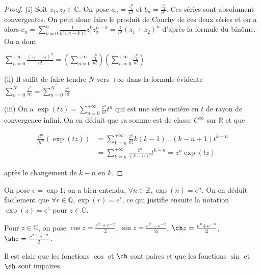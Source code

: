 \begin{proof}
(i) Soit $z_1, z_2 \in \mathbb{C}$. On pose $a_n = \frac{z_1^n}{n!}$ et $b_n = \frac{z_2^n}{n!}$. Ces séries sont absolument convergentes. On peut donc faire le produit de Cauchy de ces deux séries et on a alors $c_n = \sum_{k=0}^n \frac{1}{k!(n-k)!} z_1^k z_2^{n-k} = \frac{1}{n!}(z_1 + z_2)^n$ d'après la formule du binôme. On a donc

$\sum_{n=0}^{+\infty} \frac{(z_1 + z_2)^n}{n!} = \left(\sum_{n=0}^{+\infty} \frac{z_1^n}{n!}\right) \left(\sum_{n=0}^{+\infty} \frac{z_2^n}{n!}\right)$

(ii) Il suffit de faire tendre $N$ vers $+\infty$ dans la formule évidente $\sum_{n=0}^N \frac{\overline{z}^n}{n!} = \overline{\sum_{n=0}^N \frac{z^n}{n!}}$

(iii) On a $\exp(tz) = \sum_{n=0}^{+\infty} \frac{z^n}{n!} t^n$ qui est une série entière en $t$ de rayon de convergence infini. On en déduit que sa somme est de classe $C^\infty$ sur $\mathbb{R}$ et que

\begin{align*}
\frac{d^n}{dt^n}(\exp(tz)) &= \sum_{k=n}^{+\infty} \frac{z^k}{k!} k(k-1) \ldots (k-n+1) t^{k-n} \\
&= \sum_{k=n}^{+\infty} \frac{z^k}{(k-n)!} t^{k-n} = z^n \exp(tz)
\end{align*}

après le changement de $k-n$ en $k$.
\end{proof}

\begin{de}
On pose $e = \exp 1$; on a bien entendu, $\forall n \in \mathbb{Z}, \exp(n) = e^n$. On en déduit facilement que $\forall r \in \mathbb{Q}, \exp(r) = e^r$, ce qui justifie ensuite la notation $\exp(z) = e^z$ pour $z \in \mathbb{C}$.
\end{de}

\begin{de}
Pour $z \in \mathbb{C}$, on pose $\cos z = \frac{e^{iz} + e^{-iz}}{2}$, $\sin z = \frac{e^{iz} - e^{-iz}}{2i}$, $\ch z = \frac{e^z + e^{-z}}{2}$, $\sh z = \frac{e^z - e^{-z}}{2}$.
\end{de}

\begin{rem}
Il est clair que les fonctions $\cos$ et $\ch$ sont paires et que les fonctions $\sin$ et $\sh$ sont impaires.
\end{rem}

